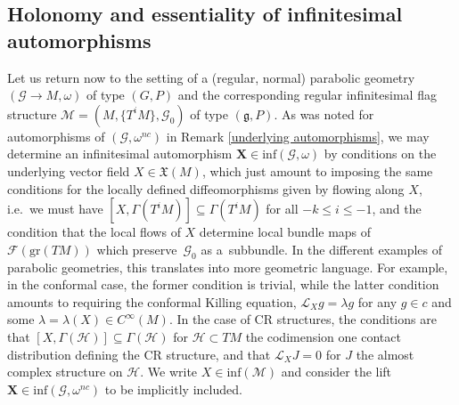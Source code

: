 \documentclass[pdftex]{sigma}
\def\g{\mathfrak{g}}
\def\Gbdle{\mathcal{G}}
\def\VF{\mathfrak{X}}
\def\Lie{\mathcal{L}}
\theoremstyle{plain}
\theoremstyle{definition}
\begin{document}
\subsection{Holonomy and essentiality of inf\/initesimal automorphisms}\label{section4.2}

Let us return now to the setting of a (regular, normal) parabolic geometry $(\Gbdle \rightarrow M,\omega)$ of type $(G,P)$ and the corresponding regular inf\/initesimal f\/lag structure $\mathcal{M} = (M,\{T^iM\},\Gbdle_0)$ of type $(\g,P)$. As was noted for automorphisms of $(\Gbdle,\omega^{nc})$ in Remark \ref{underlying automorphisms}, we may determine an inf\/initesimal automorphism $\mathbf{X} \in \mathrm{inf}(\Gbdle,\omega)$ by conditions on the underlying vector f\/ield $X \in \VF(M)$, which just amount to imposing the same conditions for the locally def\/ined dif\/feomorphisms given by f\/lowing along $X$, i.e.\ we must have $[X,\Gamma(T^iM)] \subseteq \Gamma(T^iM)$ for all $-k \leq i \leq -1$, and the condition that the local f\/lows of $X$ determine local bundle maps of $\mathcal{F}(\mathrm{gr}(TM))$ which preserve~$\Gbdle_0$ as a~subbundle. In the dif\/ferent examples of parabolic geometries, this translates into more geometric language. For example, in the conformal case, the former condition is trivial, while the latter condition amounts to requiring the conformal Killing equation, $\Lie_X g = \lambda g$ for any $g \in c$ and some $\lambda = \lambda(X) \in C^{\infty}(M)$. In the case of CR structures, the conditions are that $[X,\Gamma(\mathcal{H})] \subseteq \Gamma(\mathcal{H})$ for $\mathcal{H} \subset TM$ the codimension one contact distribution def\/ining the CR structure, and that $\Lie_X J = 0$ for $J$ the almost complex structure on $\mathcal{H}$. We write $X \in \mathrm{inf}(\mathcal{M})$ and consider the lift $\mathbf{X} \in \mathrm{inf}(\Gbdle,\omega^{nc})$ to be implicitly included.
\end{document}
